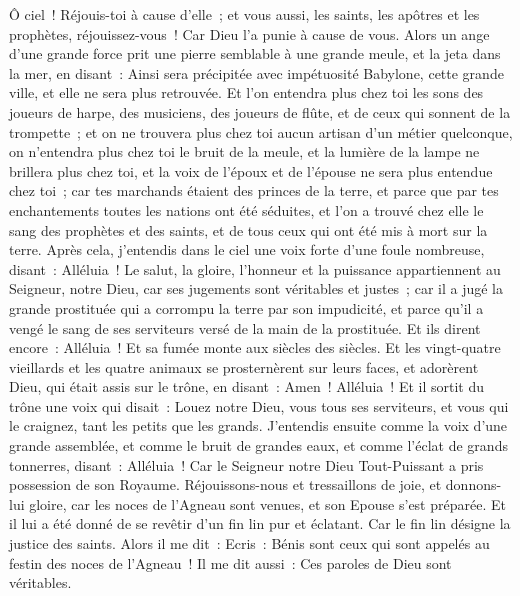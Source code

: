 \begin{multicols}{2}
Ô ciel~! Réjouis-toi à cause d'elle~; et vous aussi, les saints, les apôtres et les prophètes, réjouissez-vous~! Car Dieu l'a punie à cause de vous.
Alors un ange d'une grande force prit une pierre semblable à une grande meule, et la jeta dans la mer, en disant~: Ainsi sera précipitée avec impétuosité Babylone, cette grande ville, et elle ne sera plus retrouvée.
Et l'on entendra plus chez toi les sons des joueurs de harpe, des musiciens, des joueurs de flûte, et de ceux qui sonnent de la trompette~; et on ne trouvera plus chez toi aucun artisan d'un métier quelconque, on n'entendra plus chez toi le bruit de la meule,
et la lumière de la lampe ne brillera plus chez toi, et la voix de l'époux et de l'épouse ne sera plus entendue chez toi~; car tes marchands étaient des princes de la terre, et parce que par tes enchantements toutes les nations ont été séduites,
et l'on a trouvé chez elle le sang des prophètes et des saints, et de tous ceux qui ont été mis à mort sur la terre.
\VerseOne{}Après cela, j'entendis dans le ciel une voix forte d'une foule nombreuse, disant~: Alléluia~! Le salut, la gloire, l'honneur et la puissance appartiennent au Seigneur, notre Dieu,
car ses jugements sont véritables et justes~; car il a jugé la grande prostituée qui a corrompu la terre par son impudicité, et parce qu'il a vengé le sang de ses serviteurs versé de la main de la prostituée.
Et ils dirent encore~: Alléluia~! Et sa fumée monte aux siècles des siècles.
Et les vingt-quatre vieillards et les quatre animaux se prosternèrent sur leurs faces, et adorèrent Dieu, qui était assis sur le trône, en disant~: Amen~! Alléluia~!
Et il sortit du trône une voix qui disait~: Louez notre Dieu, vous tous ses serviteurs, et vous qui le craignez, tant les petits que les grands.
J'entendis ensuite comme la voix d'une grande assemblée, et comme le bruit de grandes eaux, et comme l'éclat de grands tonnerres, disant~: Alléluia~! Car le Seigneur notre Dieu Tout-Puissant a pris possession de son Royaume.
Réjouissons-nous et tressaillons de joie, et donnons-lui gloire, car les noces de l'Agneau sont venues, et son Epouse s'est préparée.
Et il lui a été donné de se revêtir d'un fin lin pur et éclatant. Car le fin lin désigne la justice des saints.
Alors il me dit~: Ecris~: Bénis sont ceux qui sont appelés au festin des noces de l'Agneau~! Il me dit aussi~: Ces paroles de Dieu sont véritables.

\end{multicols}
